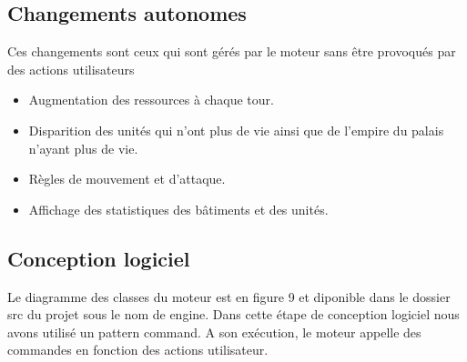 \documentclass[12pt,a4paper]{article}
\begin{document}
\subsection{Changements autonomes}
Ces changements sont ceux qui sont gérés par le moteur sans être provoqués par des actions utilisateurs
\begin{itemize}
\item Augmentation des ressources à chaque tour.
\item Disparition des unités qui n'ont plus de vie ainsi que de l'empire du palais n'ayant plus de vie.
\item Règles de mouvement et d'attaque.
\item Affichage des statistiques des bâtiments et des unités.
\end{itemize}


\subsection{Conception logiciel}
Le diagramme des classes du moteur est en figure 9 et diponible dans le dossier src du projet sous le nom de engine.
Dans cette étape de conception logiciel nous avons utilisé un pattern command. A son exécution, le moteur appelle des commandes en fonction des actions utilisateur. \\
\end{document}
